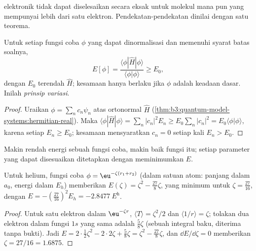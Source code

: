  elektronik tidak dapat diselesaikan secara eksak untuk
molekul mana pun yang mempunyai lebih dari satu elektron. Pendekatan-pendekatan
dinilai dengan satu teorema.

\begin{theorem}\label{thm:b3:computational-chemistry:variational}
Untuk setiap fungsi coba $\phi$ yang dapat dinormalisasi dan memenuhi syarat
batas soalnya,
\[
E[\phi] = \frac{\langle\phi|\hat H|\phi\rangle}{\langle\phi|\phi\rangle} \ge E_0,
\]
dengan $E_0$  terendah $\hat H$; kesamaan hanya berlaku jika
$\phi$ adalah  keadaan dasar. Inilah \emph{prinsip
variasi}.
\end{theorem}

\begin{proof}
Uraikan $\phi = \sum_nc_n\psi_n$ atas  ortonormal $\hat H$
(\cref{thm:b3:quantum-model-systems:hermitian-real}). Maka $\langle\phi|\hat
H|\phi\rangle = \sum_n|c_n|^2E_n \ge E_0\sum_n|c_n|^2 = E_0\langle\phi|\phi\rangle$,
karena setiap $E_n \ge E_0$; kesamaan mensyaratkan $c_n = 0$ setiap kali
$E_n > E_0$.
\end{proof}

Makin rendah energi sebuah fungsi coba, makin baik fungsi itu; setiap
parameter yang dapat disesuaikan ditetapkan dengan meminimumkan $E$.

\begin{proposition}\label{prop:b3:computational-chemistry:helium-zeta}
Untuk helium, fungsi coba $\phi = \eu^{-\zeta(r_1 + r_2)}$ (dalam satuan atom:
panjang dalam $a_0$, energi dalam $E_h$) memberikan
$E(\zeta) = \zeta^2 - \frac{27}{8}\zeta$, yang minimum untuk
$\zeta = \frac{27}{16}$, dengan $E = -(\frac{27}{16})^2 E_h =
\qty{-2.8477}{\hartree}$.
\end{proposition}

\begin{proof}
Untuk satu elektron dalam $\eu^{-\zeta r}$, $\langle T\rangle = \zeta^2/2$ dan
$\langle 1/r\rangle = \zeta$; tolakan dua elektron dalam fungsi $1s$ yang
sama adalah $\frac58\zeta$ (sebuah integral baku, diterima tanpa bukti). Jadi
$E = 2\cdot\frac12
\zeta^2 - 2\cdot2\zeta + \frac58\zeta = \zeta^2 - \frac{27}{8}\zeta$, dan $\dd E/\dd
\zeta = 0$ memberikan $\zeta = 27/16 = 1.6875$.
\end{proof}

